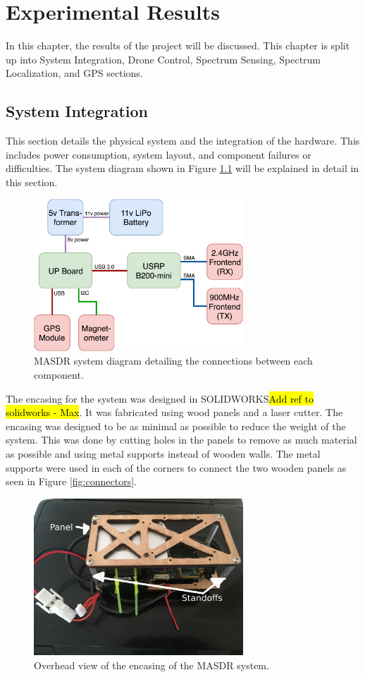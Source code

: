 \chapter{Experimental Results}
In this chapter, the results of the project will be discussed. This chapter is split up into System Integration, Drone Control, Spectrum Sensing, Spectrum Localization, and GPS sections.

\section{System Integration}
This section details the physical system and the integration of the hardware. This includes power consumption, system layout, and component failures or difficulties. The system diagram shown in Figure \ref{fig:masdr_system_diagram} will be explained in detail in this section.
\begin{figure}[ht!]
	\centering
	\includegraphics[width=0.70\textwidth]{img/masdr_system_diagram.png}
	\caption{MASDR system diagram detailing the connections between each component.}
	\label{fig:masdr_system_diagram}
\end{figure}\par
The encasing for the system was designed in SOLIDWORKS\hl{Add ref to solidworks - Max}. It was fabricated using wood panels and a laser cutter. The encasing was designed to be as minimal as possible to reduce the weight of the system. This was done by cutting holes in the panels to remove as much material as possible and using metal supports instead of wooden walls. The metal supports were used in each of the corners to connect the two wooden panels as seen in Figure \ref{fig:connectors}.
\begin{figure}[ht!]
	\centering
	\includegraphics[width=0.70\textwidth]{img/Overhead_of_box_arrows.JPG}
	\caption{Overhead view of the encasing of the MASDR system. }
	\label{fig:overhead_of_box}
\end{figure}\par
